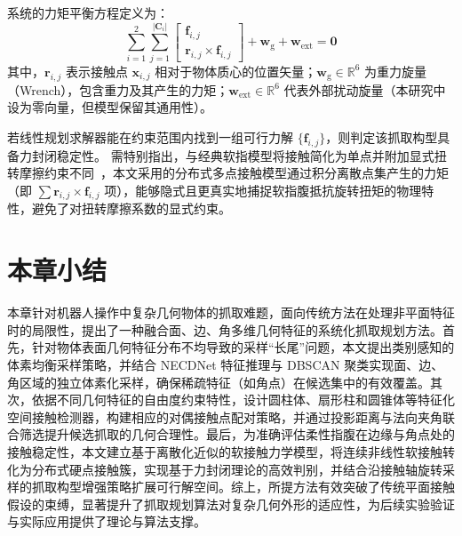 系统的力矩平衡方程定义为：
\begin{equation}
    \sum_{i=1}^2 \sum_{j=1}^{|\mathbf{C}_i|}
    \begin{bmatrix}
    \mathbf{f}_{i,j} \\[6pt]
    \mathbf{r}_{i,j} \times \mathbf{f}_{i,j}
    \end{bmatrix}
    + \mathbf{w}_{\mathrm{g}} + \mathbf{w}_{\mathrm{ext}} = \mathbf{0}
\end{equation}
其中，$\mathbf{r}_{i,j}$ 表示接触点 $\mathbf{x}_{i,j}$ 相对于物体质心的位置矢量；$\mathbf{w}_{\mathrm{g}} \in \mathbb{R}^6$ 为重力旋量（Wrench），包含重力及其产生的力矩；$\mathbf{w}_{\mathrm{ext}} \in \mathbb{R}^6$ 代表外部扰动旋量（本研究中设为零向量，但模型保留其通用性）。

若线性规划求解器能在约束范围内找到一组可行力解 $\{\mathbf{f}_{i,j}\}$，则判定该抓取构型具备力封闭稳定性。
需特别指出，与经典软指模型将接触简化为单点并附加显式扭转摩擦约束不同~\cite{murray_mathematical_1994}，本文采用的分布式多点接触模型通过积分离散点集产生的力矩（即 $\sum \mathbf{r}_{i,j} \times \mathbf{f}_{i,j}$ 项），能够隐式且更真实地捕捉软指腹抵抗旋转扭矩的物理特性，避免了对扭转摩擦系数的显式约束。

\section{本章小结}

本章针对机器人操作中复杂几何物体的抓取难题，面向传统方法在处理非平面特征时的局限性，提出了一种融合面、边、角多维几何特征的系统化抓取规划方法。首先，针对物体表面几何特征分布不均导致的采样“长尾”问题，本文提出类别感知的体素均衡采样策略，并结合 NECDNet 特征推理与 DBSCAN 聚类实现面、边、角区域的独立体素化采样，确保稀疏特征（如角点）在候选集中的有效覆盖。其次，依据不同几何特征的自由度约束特性，设计圆柱体、扇形柱和圆锥体等特征化空间接触检测器，构建相应的对偶接触点配对策略，并通过投影距离与法向夹角联合筛选提升候选抓取的几何合理性。最后，为准确评估柔性指腹在边缘与角点处的接触稳定性，本文建立基于离散化近似的软接触力学模型，将连续非线性软接触转化为分布式硬点接触簇，实现基于力封闭理论的高效判别，并结合沿接触轴旋转采样的抓取构型增强策略扩展可行解空间。综上，所提方法有效突破了传统平面接触假设的束缚，显著提升了抓取规划算法对复杂几何外形的适应性，为后续实验验证与实际应用提供了理论与算法支撑。
